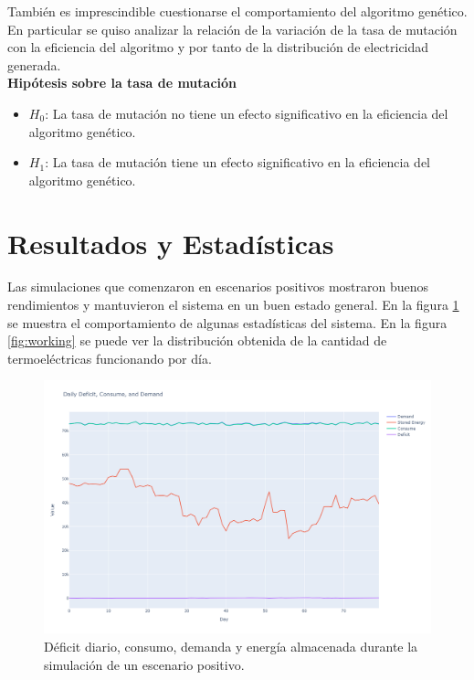 \documentclass[twocolumn, fontsize=10pt]{article}
\begin{document}
También es imprescindible cuestionarse el comportamiento del algoritmo genético. En particular 
se quiso analizar la relación de la variación de la tasa de mutación con la eficiencia del algoritmo y por tanto
de la distribución de electricidad generada.\\

\textbf{Hipótesis sobre la tasa de mutación}
\begin{itemize}
  \item \textbf{$H_0$}: La tasa de mutación no tiene un efecto significativo en la eficiencia del algoritmo genético.
  \item \textbf{$H_1$}: La tasa de mutación tiene un efecto significativo en la eficiencia del algoritmo genético.
\end{itemize}


\section{Resultados y Estadísticas}

Las simulaciones que comenzaron en escenarios positivos mostraron buenos rendimientos y mantuvieron el sistema en un buen estado general.
En la figura \ref{fig:good} se muestra el comportamiento de algunas estadísticas del sistema. En la figura \ref{fig:working} se puede ver la distribución obtenida de la cantidad de termoeléctricas funcionando por día.


\begin{figure}[H]
  \centering
  \includegraphics[width=\columnwidth]{assets/goodscenario.png}
  \caption{Déficit diario, consumo, demanda y energía almacenada durante la simulación de un escenario positivo.}
  \label{fig:good}
  \end{figure}
\end{document}
